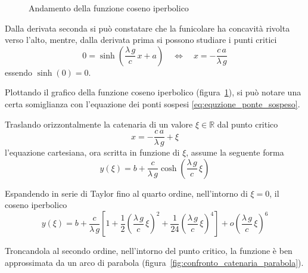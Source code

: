 \begin{figure}
  \centering
  
   \caption{Andamento della funzione coseno iperbolico}
   \label{fig:andamento_coseno_iperbolico}
  
 \end{figure}

Dalla derivata seconda si può constatare che la funicolare ha concavità rivolta verso l'alto, mentre, dalla derivata prima si possono studiare i punti critici
\[
 0 = \sinh\left(\dfrac{\lambda\,g}{c}\,x +a\right) \quad \Longleftrightarrow \quad x = -\dfrac{c\,a}{\lambda\,g}
\]
essendo $\sinh(0) = 0$.

Plottando il grafico della funzione coseno iperbolico (figura~\ref{fig:andamento_coseno_iperbolico}), si può notare una certa somiglianza con l'equazione dei ponti sospesi \eqref{eq:equzione_ponte_sospeso}.

Traslando orizzontalmente la catenaria di un valore $\xi\in\mathbb{R}$ dal punto critico 
\[x = -\dfrac{c\,a}{\lambda\,g} + \xi\]
l'equazione cartesiana, ora scritta in funzione di $\xi$, assume la seguente forma
\[
 y(\xi) = b + \dfrac{c}{\lambda\,g}\cosh\left(\dfrac{\lambda\,g}{c}\,\xi\right)
\]

Espandendo in serie di Taylor fino al quarto ordine, nell'intorno di $\xi = 0$, il coseno iperbolico
\[
 y(\xi) = b + \dfrac{c}{\lambda\,g}\left[1 + \dfrac{1}{2}\left(\dfrac{\lambda\,g}{c}\,\xi\right)^2 + \dfrac{1}{24}\left(\dfrac{\lambda\,g}{c}\,\xi\right)^4 \right] + o\left(\dfrac{\lambda\,g}{c}\,\xi\right)^6
\]

Troncandola al secondo ordine, nell'intorno del punto critico, la funzione è ben approssimata da un arco di parabola (figura~\ref{fig:confronto_catenaria_parabola}).



